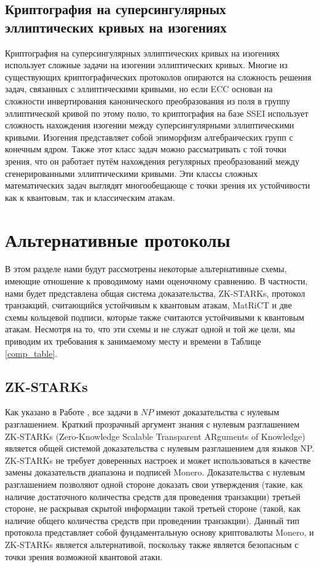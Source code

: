 \documentclass{mrl}
\begin{document}
\subsection{Криптография на суперсингулярных эллиптических кривых на изогениях}

Криптография на суперсингулярных эллиптических кривых на изогениях использует сложные задачи на изогении эллиптических кривых. Многие из существующих криптографических протоколов опираются на сложность решения задач, связанных с эллиптическими кривыми, но если ECC основан на сложности инвертирования канонического преобразования из поля в группу эллиптической кривой по этому полю, то криптография на базе SSEI использует сложность нахождения изогении между суперсингулярными эллиптическими кривыми. Изогения представляет собой эпиморфизм алгебраических групп с конечным ядром. Также этот класс задач можно рассматривать с той точки зрения, что он работает путём нахождения регулярных преобразований между сгенерированными эллиптическими кривыми. Эти классы сложных математических задач выглядят многообещающе с точки зрения их устойчивости как к квантовым, так и классическим атакам. 

\section{Альтернативные протоколы}\label{sec:altprot}
 
В этом разделе нами будут рассмотрены некоторые альтернативные схемы, имеющие отношение к проводимому нами оценочному сравнению. В частности, нами будет представлена общая система доказательства, ZK-STARKs, протокол транзакций, считающийся устойчивым к квантовым атакам, MatRiCT и две схемы кольцевой подписи, которые также считаются устойчивыми к квантовым атакам. Несмотря на то, что эти схемы и не служат одной и той же цели, мы приводим их требования к занимаемому месту и времени в Таблице \ref{comp_table}.
 
\subsection{ZK-STARKs}

Как указано в Работе \cite{goldreich1991proofs}, все задачи в $NP$ имеют доказательства с нулевым разглашением. Краткий прозрачный аргумент знания с нулевым разглашением ZK-STARKs (Zero-Knowledge Scalable Transparent ARguments of Knowledge) является общей системой доказательства с нулевым разглашением для языков NP. ZK-STARKs не требует доверенных настроек и может использоваться в качестве замены доказательств диапазона и подписей Monero. Доказательства с нулевым разглашением позволяют одной стороне доказать свои утверждения (такие, как наличие достаточного количества средств для проведения транзакции) третьей стороне, не раскрывая скрытой информации такой третьей стороне (такой, как наличие общего количества средств при проведении транзакции). Данный тип протокола представляет собой фундаментальную основу криптовалюты Monero, и ZK-STARKs является альтернативой, поскольку также является безопасным с точки зрения возможной квантовой атаки.
\end{document}

